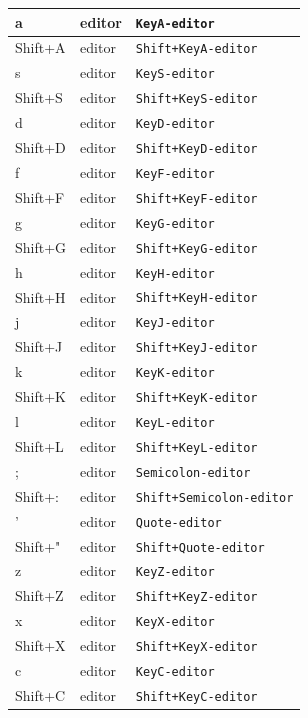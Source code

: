 \documentclass[11pt, a4paper]{article}
\begin{document}
\begin{appendices}
\begin{longtable}{|p{}|p{}|p{}|}
    a & editor & \texttt{KeyA-editor} \\ \hline
    Shift+A & editor & \texttt{Shift+KeyA-editor} \\ \hline
    s & editor & \texttt{KeyS-editor} \\ \hline
    Shift+S & editor & \texttt{Shift+KeyS-editor} \\ \hline
    d & editor & \texttt{KeyD-editor} \\ \hline
    Shift+D & editor & \texttt{Shift+KeyD-editor} \\ \hline
    f & editor & \texttt{KeyF-editor} \\ \hline
    Shift+F & editor & \texttt{Shift+KeyF-editor} \\ \hline
    g & editor & \texttt{KeyG-editor} \\ \hline
    Shift+G & editor & \texttt{Shift+KeyG-editor} \\ \hline
    h & editor & \texttt{KeyH-editor} \\ \hline
    Shift+H & editor & \texttt{Shift+KeyH-editor} \\ \hline
    j & editor & \texttt{KeyJ-editor} \\ \hline
    Shift+J & editor & \texttt{Shift+KeyJ-editor} \\ \hline
    k & editor & \texttt{KeyK-editor} \\ \hline
    Shift+K & editor & \texttt{Shift+KeyK-editor} \\ \hline
    l & editor & \texttt{KeyL-editor} \\ \hline
    Shift+L & editor & \texttt{Shift+KeyL-editor} \\ \hline
    ; & editor & \texttt{Semicolon-editor} \\ \hline
    Shift+: & editor & \texttt{Shift+Semicolon-editor} \\ \hline
    ' & editor & \texttt{Quote-editor} \\ \hline
    Shift+" & editor & \texttt{Shift+Quote-editor} \\ \hline
    z & editor & \texttt{KeyZ-editor} \\ \hline
    Shift+Z & editor & \texttt{Shift+KeyZ-editor} \\ \hline
    x & editor & \texttt{KeyX-editor} \\ \hline
    Shift+X & editor & \texttt{Shift+KeyX-editor} \\ \hline
    c & editor & \texttt{KeyC-editor} \\ \hline
    Shift+C & editor & \texttt{Shift+KeyC-editor} \\ \hline

\end{longtable}
\end{appendices}
\end{document}
